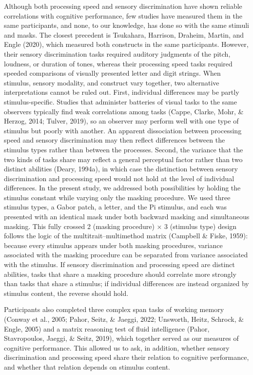 \documentclass[
  ,man]{apa6}
\begin{document}
Although both processing speed and sensory discrimination have shown reliable correlations with cognitive performance, few studies have measured them in the same participants, and none, to our knowledge, has done so with the same stimuli and masks. The closest precedent is Tsukahara, Harrison, Draheim, Martin, and Engle (2020), which measured both constructs in the same participants. However, their sensory discrimination tasks required auditory judgments of the pitch, loudness, or duration of tones, whereas their processing speed tasks required speeded comparisons of visually presented letter and digit strings. When stimulus, sensory modality, and construct vary together, two alternative interpretations cannot be ruled out. First, individual differences may be partly stimulus-specific. Studies that administer batteries of visual tasks to the same observers typically find weak correlations among tasks (Cappe, Clarke, Mohr, \& Herzog, 2014; Tulver, 2019), so an observer may perform well with one type of stimulus but poorly with another. An apparent dissociation between processing speed and sensory discrimination may then reflect differences between the stimulus types rather than between the processes. Second, the variance that the two kinds of tasks share may reflect a general perceptual factor rather than two distinct abilities (Deary, 1994a), in which case the distinction between sensory discrimination and processing speed would not hold at the level of individual differences. In the present study, we addressed both possibilities by holding the stimulus constant while varying only the masking procedure. We used three stimulus types, a Gabor patch, a letter, and the Pi stimulus, and each was presented with an identical mask under both backward masking and simultaneous masking. This fully crossed 2 (masking procedure) × 3 (stimulus type) design follows the logic of the multitrait--multimethod matrix (Campbell \& Fiske, 1959): because every stimulus appears under both masking procedures, variance associated with the masking procedure can be separated from variance associated with the stimulus. If sensory discrimination and processing speed are distinct abilities, tasks that share a masking procedure should correlate more strongly than tasks that share a stimulus; if individual differences are instead organized by stimulus content, the reverse should hold.

Participants also completed three complex span tasks of working memory (Conway et al., 2005; Pahor, Seitz, \& Jaeggi, 2022; Unsworth, Heitz, Schrock, \& Engle, 2005) and a matrix reasoning test of fluid intelligence (Pahor, Stavropoulos, Jaeggi, \& Seitz, 2019), which together served as our measures of cognitive performance. This allowed us to ask, in addition, whether sensory discrimination and processing speed share their relation to cognitive performance, and whether that relation depends on stimulus content.
\end{document}

